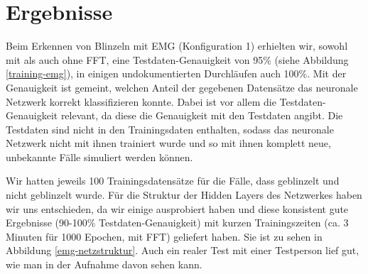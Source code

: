 \documentclass[11pt]{scrartcl}
\begin{document}

	\section{Ergebnisse}

	Beim Erkennen von Blinzeln mit EMG (Konfiguration 1) erhielten wir, sowohl mit als auch ohne FFT, eine Testdaten-Genauigkeit von 95\% (siehe Abbildung \ref{training-emg}), in einigen undokumentierten Durchläufen auch 100\%. Mit der Genauigkeit ist gemeint, welchen Anteil der gegebenen Datensätze das neuronale Netzwerk korrekt klassifizieren konnte. Dabei ist vor allem die Testdaten-Genauigkeit relevant, da diese die Genauigkeit mit den Testdaten angibt. Die Testdaten sind nicht in den Trainingsdaten enthalten, sodass das neuronale Netzwerk nicht mit ihnen trainiert wurde und so mit ihnen komplett neue, unbekannte Fälle simuliert werden können.

	\begin{figure}[H]
	\end{figure}

	
	Wir hatten jeweils 100 Trainingsdatensätze für die Fälle, dass geblinzelt und nicht geblinzelt wurde.
	Für die Struktur der Hidden Layers des Netzwerkes haben wir uns entschieden, da wir einige ausprobiert haben und diese konsistent gute Ergebnisse (90-100\% Testdaten-Genauigkeit) mit kurzen Trainingszeiten (ca. 3 Minuten für 1000 Epochen, mit FFT) geliefert haben. Sie ist zu sehen in Abbildung \ref{emg-netzstruktur}.
		Auch ein realer Test mit einer Testperson lief gut, wie man in der Aufnahme davon sehen kann. \cite{projekt-video}
\end{document}
